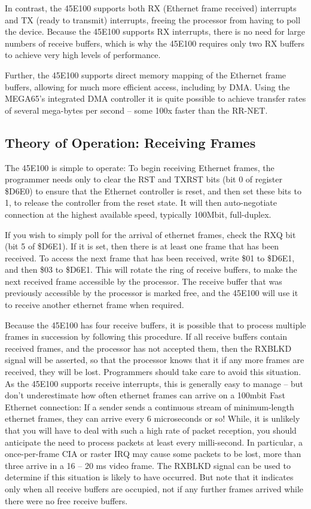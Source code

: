 In contrast, the 45E100 supports both RX (Ethernet frame received) interrupts and TX
(ready to transmit) interrupts, freeing the processor from having to poll
the device. Because the 45E100 supports RX interrupts, there is no need for large
numbers of receive buffers, which is why the 45E100 requires only two RX buffers
to achieve very high levels of performance.

Further, the 45E100 supports direct memory mapping of the
Ethernet frame buffers, allowing for much more efficient access, including
by DMA.  Using the MEGA65's integrated DMA controller it is quite possible
to achieve transfer rates of several mega-bytes per second -- some 100x
faster than the RR-NET.

\subsection{Theory of Operation: Receiving Frames}

The 45E100 is simple to operate: To begin receiving Ethernet frames, the programmer
needs only to clear the RST and TXRST bits (bit 0 of register \$D6E0) to ensure that the
Ethernet controller is reset, and then set these bits to 1, to release the controller from the reset state.
It will then auto-negotiate connection at the highest available speed, typically 100Mbit, full-duplex.

If you wish to simply poll for the arrival of ethernet frames, check the RXQ bit (bit 5 of \$D6E1).
If it is set, then there is at least one frame that has been received.  To access the next frame that
has been received, write \$01 to \$D6E1, and then \$03 to \$D6E1.  This will rotate the ring of receive
buffers, to make the next received frame accessible by the processor. The receive buffer that was previously
accessible by the processor is marked free, and the 45E100 will use it to receive another ethernet frame when required.

Because the 45E100 has four receive buffers, it is possible that to process multiple frames in succession by
following this procedure. If all receive buffers contain received frames, and the processor has not accepted them, then
the RXBLKD signal will be asserted, so that the processor knows that it if any more frames are received, they will be lost.
Programmers should take care to avoid this situation.  As the 45E100 supports receive interrupts, this is generally easy
to manage -- but don't underestimate how often ethernet frames can arrive on a 100mbit Fast Ethernet connection:
If a sender sends a continuous stream of minimum-length ethernet frames, they can arrive every 6 microseconds or so!
While, it is unlikely that you will have to deal with such a high rate of packet reception, you should anticipate the need
to process packets at least every milli-second. In particular, a once-per-frame CIA or raster IRQ may cause some packets
to be lost, more than three arrive in a 16 -- 20 ms video frame.  The RXBLKD signal can be used to determine if this situation
is likely to have occurred. But note that it indicates only when all receive buffers are occupied, not if any further frames
arrived while there were no free receive buffers.

